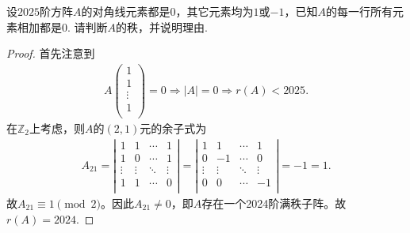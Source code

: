 \documentclass[../../main.tex]{subfiles}%
\begin{document}
\begin{example}
设$2025$阶方阵$A$的对角线元素都是$0$，其它元素均为$1$或$-1$，已知$A$的每一行所有元素相加都是$0$. 请判断$A$的秩，并说明理由.
\end{example}
\begin{proof}
首先注意到
\begin{align*}
A\left( \begin{array}{c}
1\\
1\\
\vdots\\
1\\
\end{array} \right) =0\Longrightarrow \left| A \right|=0\Longrightarrow r\left( A \right) <2025.
\end{align*}
在$\mathbb{Z}_2$上考虑，则$A$的$(2,1)$元的余子式为
\begin{align*}
A_{21}=\left| \begin{matrix}
1&		1&		\cdots&		1\\
1&		0&		\cdots&		1\\
\vdots&		\vdots&		\ddots&		\vdots\\
1&		1&		\cdots&		0\\
\end{matrix} \right|=\left| \begin{matrix}
1&		1&		\cdots&		1\\
0&		-1&		\cdots&		0\\
\vdots&		\vdots&		\ddots&		\vdots\\
0&		0&		\cdots&		-1\\
\end{matrix} \right|=-1=1.
\end{align*}
故$A_{21}\equiv 1 \pmod{2}$。因此$A_{21}\ne 0$，即$A$存在一个2024阶满秩子阵。故$r\left( A \right) =2024$.
\end{proof}
\end{document}
